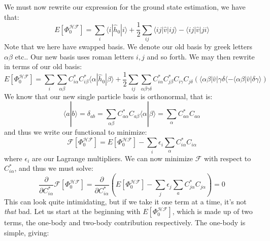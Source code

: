\documentclass{article}
\begin{document}
\section{}
We must now rewrite our expression for the ground state estimation, we have that:
\begin{equation*}
    E[\Phi_0^{\mathcal{H}\mathcal{F}}] = \sum_i \langle i | \hat h_0 | i \rangle + \frac{1}{2} \sum_{ij} \langle ij | \hat v | ij \rangle - \langle ij | \hat v | ji \rangle
\end{equation*}
Note that we here have swapped basis. We denote our old basis by greek letters $\alpha \beta $ etc.. Our new basis uses roman letters $i, j$ and so forth. We may then rewrite in terms of our old basis:
\begin{equation*}
    E[\Phi_0^{\mathcal{H}\mathcal{F}}] = \sum_i \sum_{\alpha \beta} C_{i\alpha}^* C_{i \beta}^* \langle \alpha | \hat h_0 | \beta \rangle + \frac{1}{2} \sum_{ij}\sum_{\alpha \beta \gamma \delta}C_{i\alpha}^* C_{j\beta}^* C_{i\gamma} C_{j\delta} \left(\langle \alpha \beta | \hat v | \gamma \delta \langle - \langle \alpha \beta | \hat v | \delta \gamma \rangle \right)
\end{equation*}
We know that our new single particle basis is orthonormal, that is:
\begin{equation*}
    \langle a | b \rangle = \delta_{a b} = \sum_{\alpha\beta} C_{a \alpha}^* C_{a \beta} \langle \alpha | \beta \rangle = \sum_\alpha C_{a \alpha}^* C_{a \alpha}
\end{equation*}
and thus we write our functional to minimize:
\begin{equation}
    \mathcal{F}[\Phi_0^{\mathcal{H}\mathcal{F}}] = E[\Phi_0^{\mathcal{H}\mathcal{F}}] - \sum_i \epsilon_i \sum_\alpha C_{i\alpha}^* C_{i \alpha}
\end{equation}
where $\epsilon_i$ are our Lagrange multipliers.\newline
We can now minimize $\mathcal{F}$ with respect to $C_{i \alpha}^*$, and thus we must solve:
\begin{equation*}
    \frac{\partial}{\partial C_{i \alpha}^*} \mathcal{F}[\Phi_0^{\mathcal{H}\mathcal{F}}] = \frac{\partial}{\partial C_{i \alpha}^*} \left( E[\Phi_0^{\mathcal{H}\mathcal{F}}] - \sum_j \epsilon_j \sum_a C_{j \alpha}^* C_{j \alpha} \right) = 0
\end{equation*}
This can look quite intimidating, but if we take it one term at a time, it's not \emph{that} bad. Let us start at the beginning with $E[\Phi_0^{\mathcal{H}\mathcal{F}}]$, which is made up of two terms, the one-body and two-body contribution respectively. The one-body is simple, giving:
\end{document}

